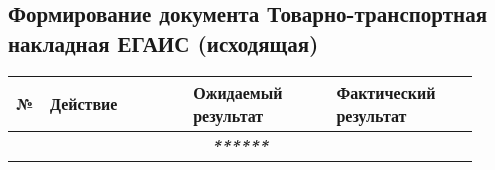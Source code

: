\subsection{Формирование документа Товарно-транспортная накладная ЕГАИС (исходящая)}

\renewcommand{\arraystretch}{1.8} %
\begin{longtable}{|p{0.02\linewidth}|p{0.3\linewidth}|p{0.3\linewidth}|p{0.3\linewidth}|}
    \hline
    № & \textbf{Действие} & \textbf{Ожидаемый результат} & \textbf{Фактический результат} \\
    \hline
    \hline
    \endhead
    \multicolumn{4}{|c|}{\textbf{\textit{******}}} \\
    \hline
    \hline



\end{longtable}
